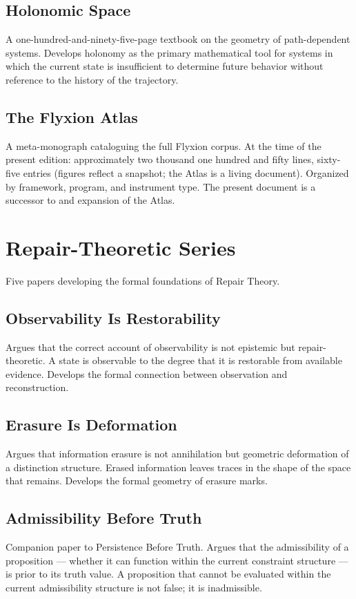 \documentclass[12pt, openany]{book}
\begin{document}
\subsection{Holonomic Space} A one-hundred-and-ninety-five-page textbook
on the geometry of path-dependent systems. Develops holonomy as the primary
mathematical tool for systems in which the current state is insufficient to
determine future behavior without reference to the history of the trajectory.

\subsection{The Flyxion Atlas} A meta-monograph cataloguing the full
Flyxion corpus. At the time of the present edition: approximately two
thousand one hundred and fifty lines, sixty-five entries (figures reflect
a snapshot; the Atlas is a living document). Organized by framework,
program, and instrument type.
The present document is a successor to and expansion of the Atlas.

\section{Repair-Theoretic Series}

Five papers developing the formal foundations of Repair Theory.

\subsection{Observability Is Restorability} Argues that the correct account
of observability is not epistemic but repair-theoretic. A state is
observable to the degree that it is restorable from available evidence.
Develops the formal connection between observation and reconstruction.

\subsection{Erasure Is Deformation} Argues that information erasure is not
annihilation but geometric deformation of a distinction structure. Erased
information leaves traces in the shape of the space that remains. Develops
the formal geometry of erasure marks.

\subsection{Admissibility Before Truth} Companion paper to Persistence
Before Truth. Argues that the admissibility of a proposition — whether it
can function within the current constraint structure — is prior to its
truth value. A proposition that cannot be evaluated within the current
admissibility structure is not false; it is inadmissible.
\end{document}
